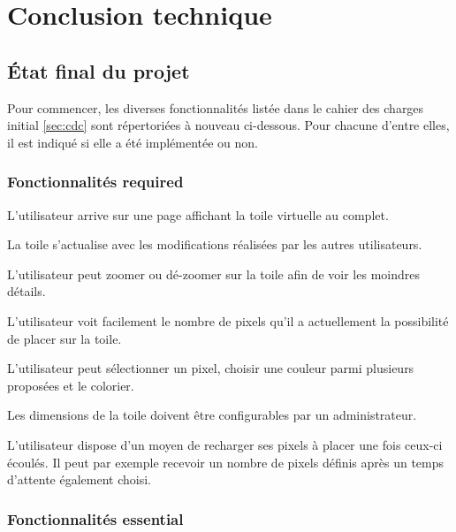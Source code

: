 \section{Conclusion technique}

\subsection{État final du projet}


Pour commencer, les diverses fonctionnalités listée dans le cahier des charges initial \ref{sec:cdc} sont répertoriées à nouveau ci-dessous. Pour chacune d'entre elles, il est indiqué si elle a été implémentée ou non.

\subsubsection{Fonctionnalités \guillemotleft required\guillemotright}

\begin{todolist}
  \item[\done] L'utilisateur arrive sur une page affichant la toile virtuelle au complet.
  \item[\done] La toile s'actualise avec les modifications réalisées par les autres utilisateurs.
  \item[\done] L'utilisateur peut zoomer ou dé-zoomer sur la toile afin de voir les moindres détails.
  \item[\done] L'utilisateur voit facilement le nombre de pixels qu'il a actuellement la possibilité de placer sur la toile.
  \item[\done] L'utilisateur peut sélectionner un pixel, choisir une couleur parmi plusieurs proposées et le colorier.
  \item[\done] Les dimensions de la toile doivent être configurables par un administrateur.
  \item[\done] L'utilisateur dispose d'un moyen de recharger ses pixels à placer une fois ceux-ci écoulés. Il peut par exemple recevoir un nombre de pixels définis après un temps d'attente également choisi.
\end{todolist}

\subsubsection{Fonctionnalités \guillemotleft essential\guillemotright}

